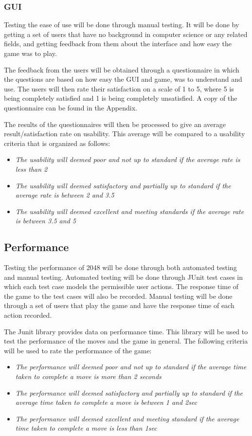\documentclass[12pt]{article}
\begin{document}
\subsubsection{GUI}
	Testing the ease of use will be done through manual testing. It will be done by getting a set of users that have no background in computer science or any related fields, and getting feedback from them about the interface and how easy the game was to play.
	\par The feedback from the users will be obtained through a questionnaire in which the questions are based on how easy the GUI and game, was to understand and use. The users will then rate their satisfaction on a scale of 1 to 5, where 5 is being completely satisfied and 1 is being completely unsatisfied. A copy of the questionnaire can be found in the Appendix.
	\par The results of the questionnaires will then be processed to give an average result/satisfaction rate on usability. This average will be compared to a usability criteria that is organized as follows:
\begin{itemize}
\item\emph{The usability will deemed poor and not up to standard if the average rate is less than 2}
\item\emph{The usability will deemed satisfactory and partially up to standard if the average rate is between 2 and 3.5}
\item\emph{The usability will deemed excellent and meeting standards if the average rate is between 3.5 and 5}

\end{itemize}

\subsection{Performance}

Testing the performance of 2048 will be done through both automated testing and manual testing. Automated testing will be done through JUnit test cases in which each test case models the permissible user actions. The response time of the game to the test cases will also be recorded. Manual testing will be done through a set of users that play the game and have the response time of each action recorded.
\par The Junit library provides data on performance time. This library will be used to test the performance of the moves and the game in general. The following criteria will be used to rate the performance of the game:
\begin{itemize}
\item\emph{The performance will deemed poor and not up to standard if the average time taken to complete a move is more than 2 seconds}
\item\emph{The performance will deemed satisfactory and partially up to standard if the average time taken to complete a move is between 1 and 2sec}
\item\emph{The performance will deemed excellent and meeting standard if the average time taken to complete a move is less than 1sec}

\end{itemize}
\end{document}
